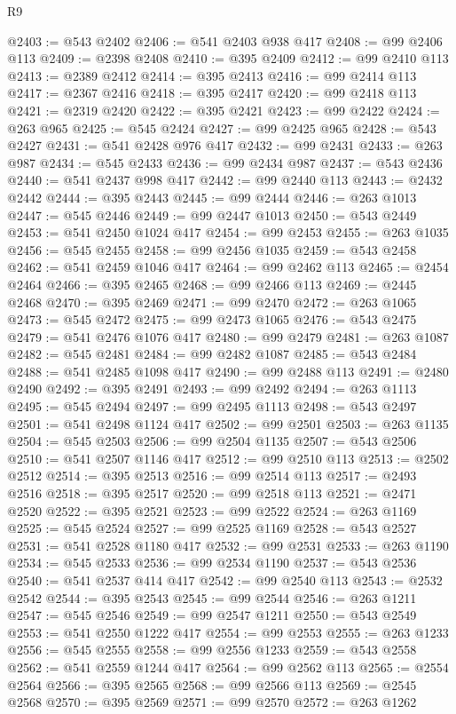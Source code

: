 \begin{lexlean}{R9}
\begin{coremodule}
@2403 := @543 @2402
@2406 := @541 @2403 @938 @417
@2408 := @99 @2406 @113
@2409 := @2398 @2408
@2410 := @395 @2409
@2412 := @99 @2410 @113
@2413 := @2389 @2412
@2414 := @395 @2413
@2416 := @99 @2414 @113
@2417 := @2367 @2416
@2418 := @395 @2417
@2420 := @99 @2418 @113
@2421 := @2319 @2420
@2422 := @395 @2421
@2423 := @99 @2422
@2424 := @263 @965
@2425 := @545 @2424
@2427 := @99 @2425 @965
@2428 := @543 @2427
@2431 := @541 @2428 @976 @417
@2432 := @99 @2431
@2433 := @263 @987
@2434 := @545 @2433
@2436 := @99 @2434 @987
@2437 := @543 @2436
@2440 := @541 @2437 @998 @417
@2442 := @99 @2440 @113
@2443 := @2432 @2442
@2444 := @395 @2443
@2445 := @99 @2444
@2446 := @263 @1013
@2447 := @545 @2446
@2449 := @99 @2447 @1013
@2450 := @543 @2449
@2453 := @541 @2450 @1024 @417
@2454 := @99 @2453
@2455 := @263 @1035
@2456 := @545 @2455
@2458 := @99 @2456 @1035
@2459 := @543 @2458
@2462 := @541 @2459 @1046 @417
@2464 := @99 @2462 @113
@2465 := @2454 @2464
@2466 := @395 @2465
@2468 := @99 @2466 @113
@2469 := @2445 @2468
@2470 := @395 @2469
@2471 := @99 @2470
@2472 := @263 @1065
@2473 := @545 @2472
@2475 := @99 @2473 @1065
@2476 := @543 @2475
@2479 := @541 @2476 @1076 @417
@2480 := @99 @2479
@2481 := @263 @1087
@2482 := @545 @2481
@2484 := @99 @2482 @1087
@2485 := @543 @2484
@2488 := @541 @2485 @1098 @417
@2490 := @99 @2488 @113
@2491 := @2480 @2490
@2492 := @395 @2491
@2493 := @99 @2492
@2494 := @263 @1113
@2495 := @545 @2494
@2497 := @99 @2495 @1113
@2498 := @543 @2497
@2501 := @541 @2498 @1124 @417
@2502 := @99 @2501
@2503 := @263 @1135
@2504 := @545 @2503
@2506 := @99 @2504 @1135
@2507 := @543 @2506
@2510 := @541 @2507 @1146 @417
@2512 := @99 @2510 @113
@2513 := @2502 @2512
@2514 := @395 @2513
@2516 := @99 @2514 @113
@2517 := @2493 @2516
@2518 := @395 @2517
@2520 := @99 @2518 @113
@2521 := @2471 @2520
@2522 := @395 @2521
@2523 := @99 @2522
@2524 := @263 @1169
@2525 := @545 @2524
@2527 := @99 @2525 @1169
@2528 := @543 @2527
@2531 := @541 @2528 @1180 @417
@2532 := @99 @2531
@2533 := @263 @1190
@2534 := @545 @2533
@2536 := @99 @2534 @1190
@2537 := @543 @2536
@2540 := @541 @2537 @414 @417
@2542 := @99 @2540 @113
@2543 := @2532 @2542
@2544 := @395 @2543
@2545 := @99 @2544
@2546 := @263 @1211
@2547 := @545 @2546
@2549 := @99 @2547 @1211
@2550 := @543 @2549
@2553 := @541 @2550 @1222 @417
@2554 := @99 @2553
@2555 := @263 @1233
@2556 := @545 @2555
@2558 := @99 @2556 @1233
@2559 := @543 @2558
@2562 := @541 @2559 @1244 @417
@2564 := @99 @2562 @113
@2565 := @2554 @2564
@2566 := @395 @2565
@2568 := @99 @2566 @113
@2569 := @2545 @2568
@2570 := @395 @2569
@2571 := @99 @2570
@2572 := @263 @1262

\end{coremodule}
\end{lexlean}
